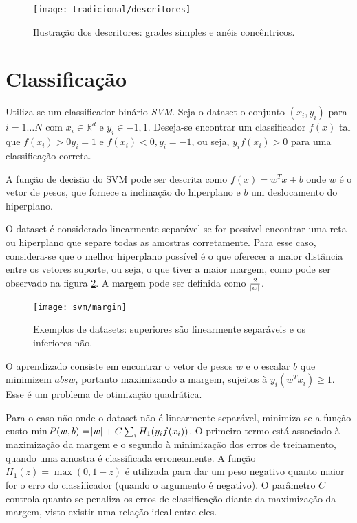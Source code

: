 \begin{figure}[h]
\caption{Ilustração dos descritores: grades simples e anéis concêntricos.}
\centering
\texttt{[image: tradicional/descritores]}
\label{fig:descritores}
\end{figure}

\section{Classificação}

Utiliza-se um classificador binário \textit{SVM}. Seja o dataset o conjunto $(x_i, y_i)$ para $i=1 \dots N$ com $x_i \in \mathbb{R}^d$ e $y_i \in {-1, 1}$. Deseja-se encontrar um classificador $f(x)$ tal que $f(x_i)>0 y_i=1$ e $f(x_i)<0, y_i=-1$, ou seja, $y_i f(x_i) > 0$ para uma classificação correta.

A função de decisão do SVM pode ser descrita como $f(x)=w^T x+ b$ onde $w$ é o vetor de pesos, que fornece a inclinação do hiperplano e $b$ um deslocamento do hiperplano.

O dataset é considerado linearmente separável se for possível encontrar uma reta ou hiperplano que separe todas as amostras corretamente. Para esse caso, considera-se que o melhor hiperplano possível é o que oferecer a maior distância entre os vetores suporte, ou seja, o que tiver a maior margem, como pode ser observado na figura \ref{fig:svm-margin}. A margem pode ser definida como $\frac{2}{\abs{w}}$.

\begin{figure}[h]
\caption{Exemplos de datasets: superiores são linearmente separáveis e os inferiores não.}
\centering
\texttt{[image: svm/margin]}
\label{fig:svm-margin}
\end{figure}

O aprendizado consiste em encontrar o vetor de pesos $w$ e o escalar $b$ que minimizem $abs{w}$, portanto maximizando a margem, sujeitos à $y_i(w^T x_i) \geq 1$. Esse é um problema de otimização quadrática.

Para o caso não onde o dataset não é linearmente separável, minimiza-se a função custo $\min P(w,b) = \abs{w} + C\sum_i H_1(y_i f(x_i))$. O primeiro termo está associado à maximização da margem e o segundo à minimização dos erros de treinamento, quando uma amostra é classificada erroneamente. A função $H_1(z)=\max(0,1-z)$ é utilizada para dar um peso negativo quanto maior for o erro do classificador (quando o argumento é negativo). O parâmetro $C$ controla quanto se penaliza os erros de classificação diante da maximização da margem, visto existir uma relação ideal entre eles.

